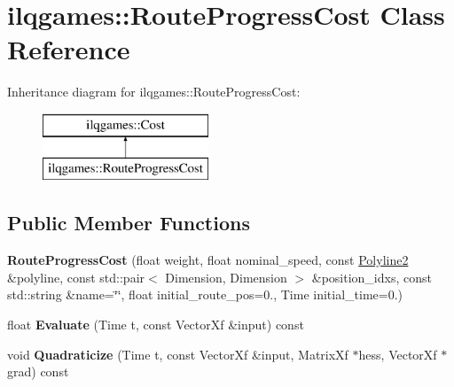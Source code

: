 \hypertarget{classilqgames_1_1_route_progress_cost}{}\section{ilqgames\+:\+:Route\+Progress\+Cost Class Reference}
\label{classilqgames_1_1_route_progress_cost}
Inheritance diagram for ilqgames\+:\+:Route\+Progress\+Cost\+:\begin{figure}[H]
\begin{center}
\leavevmode
\includegraphics[height=2.000000cm]{classilqgames_1_1_route_progress_cost}
\end{center}
\end{figure}
\subsection*{Public Member Functions}
\begin{DoxyCompactItemize}
\item 
{\bfseries Route\+Progress\+Cost} (float weight, float nominal\+\_\+speed, const \hyperlink{classilqgames_1_1_polyline2}{Polyline2} \&polyline, const std\+::pair$<$ Dimension, Dimension $>$ \&position\+\_\+idxs, const std\+::string \&name=\char`\"{}\char`\"{}, float initial\+\_\+route\+\_\+pos=0., Time initial\+\_\+time=0.)\hypertarget{classilqgames_1_1_route_progress_cost_ab2c7d990abd1ba3a5df7c6e475d8fec0}{}\label{classilqgames_1_1_route_progress_cost_ab2c7d990abd1ba3a5df7c6e475d8fec0}

\item 
float {\bfseries Evaluate} (Time t, const Vector\+Xf \&input) const \hypertarget{classilqgames_1_1_route_progress_cost_a93a76046fac60030e3f8767c0b8efea0}{}\label{classilqgames_1_1_route_progress_cost_a93a76046fac60030e3f8767c0b8efea0}

\item 
void {\bfseries Quadraticize} (Time t, const Vector\+Xf \&input, Matrix\+Xf $\ast$hess, Vector\+Xf $\ast$grad) const \hypertarget{classilqgames_1_1_route_progress_cost_a51ac030f155eafcf5c7f52ee7220ec4f}{}\label{classilqgames_1_1_route_progress_cost_a51ac030f155eafcf5c7f52ee7220ec4f}

\end{DoxyCompactItemize}
